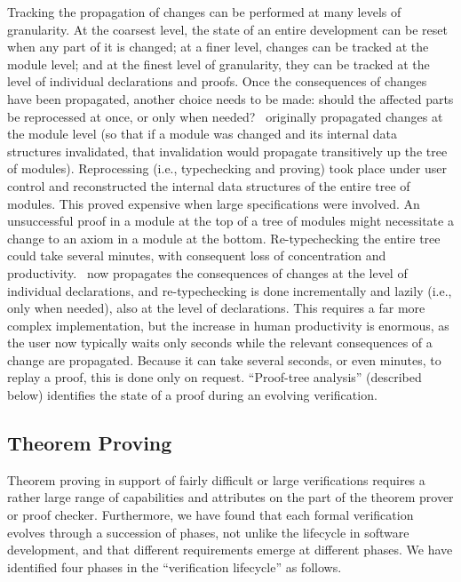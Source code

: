 Tracking the propagation of changes can be performed at many levels
of granularity.  At the coarsest level, the state of an entire
development can be reset when any part of it is changed; at a finer
level, changes can be tracked at the module level; and at the finest
level of granularity, they can be tracked at the level of individual
declarations and proofs.  Once the consequences of changes have been
propagated, another choice needs to be made: should the affected
parts be reprocessed at once, or only when needed?  \ehdm\ originally
propagated changes at the module level (so that if a module was
changed and its internal data structures invalidated, that
invalidation would propagate transitively up the tree of modules).
Reprocessing (i.e., typechecking and proving) took place under user
control and reconstructed the internal data structures of the entire
tree of modules.  This proved expensive when large specifications
were involved.  An unsuccessful proof in a module at the top of a
tree of modules might necessitate a change to an axiom in a module at
the bottom.  Re-typechecking the entire tree could take several
minutes, with consequent loss of concentration and productivity.
\ehdm\ now propagates the consequences of changes at the level of
individual declarations, and re-typechecking is done incrementally
and lazily (i.e., only when needed), also at the level of
declarations.  This requires a far more complex implementation, but
the increase in human productivity is enormous, as the user now
typically waits only seconds while the relevant consequences of a
change are propagated.  Because it can take several seconds, or even
minutes, to replay a proof, this is done only on request.
``Proof-tree analysis'' (described below) identifies the state of a
proof during an evolving verification.

\subsection{Theorem Proving}

Theorem proving in support of fairly difficult or large verifications
requires a rather large range of capabilities and attributes on the
part of the theorem prover or proof checker.  Furthermore, we have
found that each formal verification evolves through a succession of
phases, not unlike the lifecycle in software development, and that
different requirements emerge at different phases.  We have
identified four phases in the ``verification lifecycle'' as follows.

